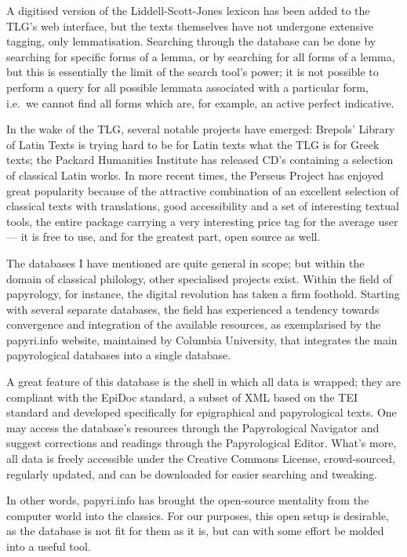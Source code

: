 A digitised version of the Liddell-Scott-Jones lexicon has been added to the
TLG's web interface, but the texts themselves have not undergone extensive
tagging, only lemmatisation.  Searching through the database can be done by
searching for specific forms of a lemma, or by searching for all forms of a
lemma, but this is essentially the limit of the search tool's power; it is not
possible to perform a query for all possible lemmata associated with a
particular form, i.e.\ we cannot find all forms which are, for example, an
active perfect indicative.

In the wake of the TLG, several notable projects have emerged: Brepols' Library
of Latin Texts is trying hard to be for Latin texts what the TLG is for Greek
texts; the Packard Humanities Institute has released CD's containing a
selection of classical Latin works. In more recent times, the Perseus Project
has enjoyed great popularity because of the attractive combination of an
excellent selection of classical texts with translations, good accessibility
and a set of interesting textual tools, the entire package carrying a very
interesting price tag for the average user — it is free to use, and for the
greatest part, open source as well.

The databases I have mentioned are quite general in scope; but within the
domain of classical philology, other specialised projects exist. Within the
field of papyrology, for instance, the digital revolution has taken a firm
foothold. Starting with several separate databases, the field has experienced a
tendency towards convergence and integration of the available resources, as
exemplarised by the papyri.info website, maintained by Columbia University,
that integrates the main papyrological databases into a single database.

A great feature of this database is the shell in which all data is wrapped;
they are compliant with the EpiDoc standard, a subset of XML based on the TEI
standard and developed specifically for epigraphical and papyrological texts.
One may access the database’s resources through the Papyrological Navigator and
suggest corrections and readings through the Papyrological Editor. What’s more,
all data is freely accessible under the Creative Commons License,
crowd-sourced, regularly updated, and can be downloaded for easier searching
and tweaking.

In other words, papyri.info has brought the open-source mentality from the
computer world into the classics. For our purposes, this open setup is
desirable, as the database is not fit for them as it is, but can with some
effort be molded into a useful tool.

